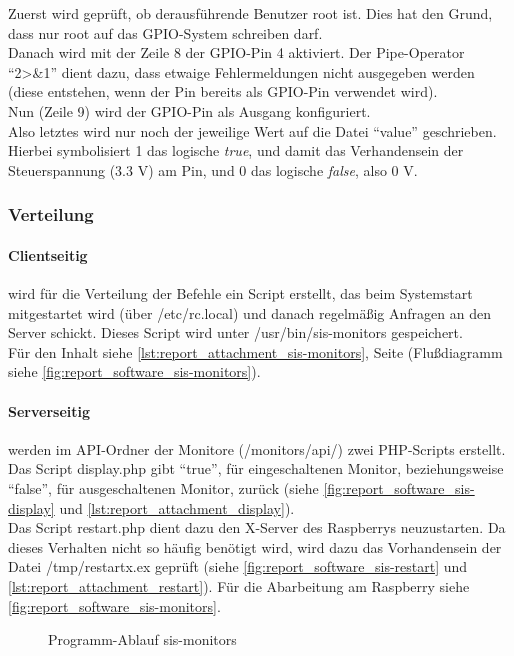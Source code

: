 Zuerst wird geprüft, ob derausführende Benutzer root ist. Dies hat den Grund, dass nur root auf das GPIO-System schreiben darf.\\
Danach wird mit der Zeile 8 der GPIO-Pin 4 aktiviert. Der Pipe-Operator \enquote{2>\&1} dient dazu, dass etwaige Fehlermeldungen nicht ausgegeben werden (diese entstehen, wenn der Pin bereits als GPIO-Pin verwendet wird).\\
Nun (Zeile 9) wird der GPIO-Pin als Ausgang konfiguriert.\\
Also letztes wird nur noch der jeweilige Wert auf die Datei \enquote{value} geschrieben. Hierbei symbolisiert 1 das logische \textit{true}, und damit das Verhandensein der Steuerspannung (3.3 V) am Pin, und 0 das logische \textit{false}, also 0 V.

\subsubsection{Verteilung}

\paragraph{Clientseitig}
wird für die Verteilung der Befehle ein Script erstellt, das beim Systemstart mitgestartet wird (über /etc/rc.local) und danach regelmäßig Anfragen an den Server schickt.
Dieses Script wird unter /usr/bin/sis-monitors gespeichert.\\
Für den Inhalt siehe \autoref{lst:report_attachment_sis-monitors}, Seite \pageref{lst:report_attachment_sis-monitors} (Flußdiagramm siehe \autoref{fig:report_software_sis-monitors}).\\

\paragraph{Serverseitig} werden im API-Ordner der Monitore (/monitors/api/) zwei PHP-Scripts erstellt.\\
Das Script display.php gibt \enquote{true}, für eingeschaltenen Monitor, beziehungsweise \enquote{false}, für ausgeschaltenen Monitor, zurück (siehe \autoref{fig:report_software_sis-display} und \autoref{lst:report_attachment_display}).\\
Das Script restart.php dient dazu den X-Server des Raspberrys neuzustarten. Da dieses Verhalten nicht so häufig benötigt wird, wird dazu das Vorhandensein der Datei /tmp/restartx.ex geprüft (siehe \autoref{fig:report_software_sis-restart} und \autoref{lst:report_attachment_restart}). Für die Abarbeitung am Raspberry siehe \autoref{fig:report_software_sis-monitors}.
\\
\begin{figure}[H]
\centering
{}
\caption{Programm-Ablauf sis-monitors}
\label{fig:report_software_sis-monitors}
\end{figure}

